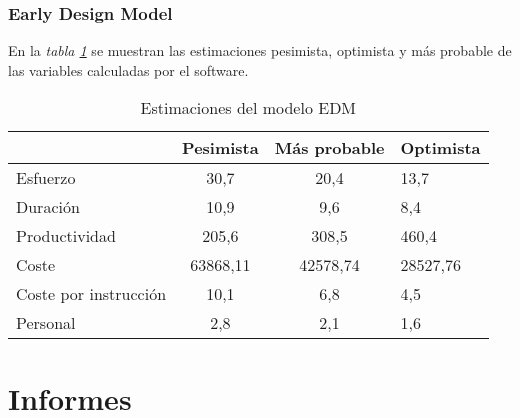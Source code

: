 \documentclass[11pt,a4paper,spanish,twoside]{report}
\begin{document}
\subsection{Early Design Model}
En la \emph{tabla \ref{Tab:EstEDM}} se muestran las estimaciones pesimista,
optimista y más probable de las variables calculadas por el software.
\begin{table}[!h]
  \centering
  \begin{tabular}{p{4.5cm}|c|c|b{2cm}<{\centering}}
    & \textbf{Pesimista} & \textbf{Más probable} & \textbf{Optimista}\\
    \hline \hline
    Esfuerzo & 30,7 & 20,4 & 13,7 \\ \hline
    Duración & 10,9 & 9,6 & 8,4 \\ \hline
    Productividad & 205,6 & 308,5 & 460,4 \\ \hline
    Coste & 63868,11 & 42578,74 & 28527,76 \\ \hline
    Coste por instrucción & 10,1 & 6,8 & 4,5 \\ \hline
    Personal & 2,8 & 2,1 & 1,6 \\ \hline
  \end{tabular}
  \caption{Estimaciones del modelo EDM} \label{Tab:EstEDM}
\end{table}

\chapter{Informes}
\end{document}
